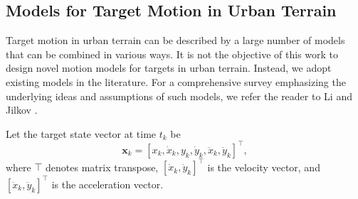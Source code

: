 \documentclass[times]{asjcauth}
\begin{document}
\subsection{Models for Target Motion in Urban Terrain}
\label{secmotion}

Target motion in urban terrain can be described by a large number of models that can be combined in various ways. It is not the objective of this work to design novel motion models for targets in urban terrain. Instead, we adopt existing models in the literature. For a comprehensive survey emphasizing the underlying ideas and assumptions of such models, we refer the reader to Li and Jilkov \cite{jilkov}.

Let the target state vector at time $t_{k}$ be
\begin{equation*}
\mathbf{x}_{k} = \left[x_{k},\dot{x}_{k},y_{k},\dot{y}_{k},\ddot{x}_{k},\ddot{y}_{k}\right]^{\top},
\end{equation*}
\noindent where $\top$ denotes matrix transpose, $\left[\dot{x}_{k},\dot{y}_{k}\right]^{\top}$ is the velocity vector, and $\left[\ddot{x}_{k},\ddot{y}_{k}\right]^{\top}$ is the acceleration vector.
\end{document}
